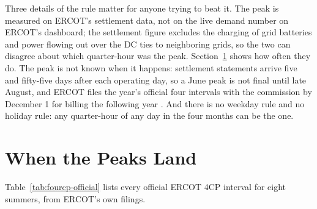 Three details of the rule matter for anyone trying to beat it. The peak is measured on ERCOT's settlement data, not on the live demand number on ERCOT's dashboard; the settlement figure excludes the charging of grid batteries and power flowing out over the DC ties to neighboring grids, so the two can disagree about which quarter-hour was the peak. %
Section~\ref{sec:fourcp-peaks} shows how often they do. The peak is not known when it happens: settlement statements arrive five and fifty-five days after each operating day, so a June peak is not final until late August, and ERCOT files the year's official four intervals with the commission by December 1 for billing the following year \autocite{ercot2026protocols,ercot2024mktnotice4cp}. %
And there is no weekday rule and no holiday rule: any quarter-hour of any day in the four months can be the one.

\section{When the Peaks Land}
\label{sec:fourcp-peaks}

Table~\ref{tab:fourcp-official} lists every official ERCOT 4CP interval for eight summers, from ERCOT's own filings. %

